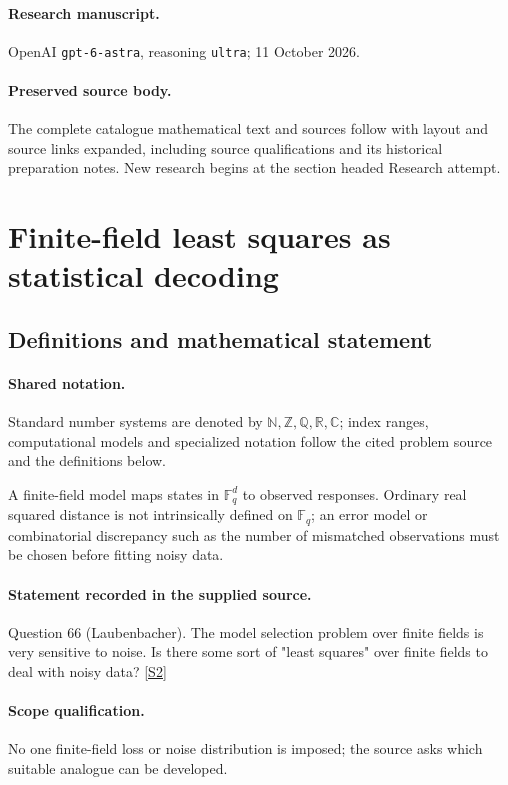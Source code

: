 \documentclass[11pt]{article}
\begin{document}
\paragraph{Research manuscript.} OpenAI \texttt{gpt-6-astra}, reasoning \texttt{ultra}; 11 October 2026.
\paragraph{Preserved source body.} The complete catalogue mathematical text and sources follow with layout and source links expanded, including source qualifications and its historical preparation notes. New research begins at the section headed Research attempt.

\section{Finite-field least squares as statistical decoding}\label{statement}

\subsection{Definitions and mathematical statement}

\paragraph{Shared notation.}Standard number systems are denoted by $\mathbb N,\mathbb Z,\mathbb Q,\mathbb R,\mathbb C$; index ranges, computational models and specialized notation follow the cited problem source and the definitions below.


A finite-field model maps states in $\mathbb F_q^d$ to observed responses. Ordinary real squared distance is not intrinsically defined on $\mathbb F_q$; an error model or combinatorial discrepancy such as the number of mismatched observations must be chosen before fitting noisy data.
\paragraph{Statement recorded in the supplied source.}
Question 66 (Laubenbacher). The model selection problem over finite fields is very sensitive to noise. Is there some sort of "least squares" over finite fields to deal with noisy data? \href{https://aimath.org/WWN/compalgstat/compalgstat.pdf}{[S2]}
\paragraph{Scope qualification.}
No one finite-field loss or noise distribution is imposed; the source asks which suitable analogue can be developed.
\end{document}
